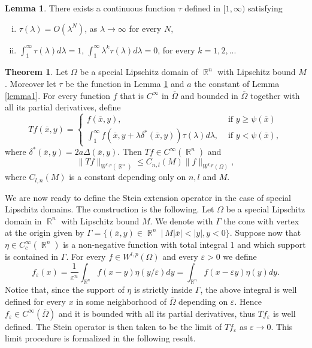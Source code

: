 \documentclass[12pt]{article}
\theoremstyle{definition}
\newtheorem{theorem}{Theorem}
\newtheorem{lemma}{Lemma}
\DeclareMathOperator\rr{\mathbb{R}}
\begin{document}
\begin{lemma}\label{lemma2}
There exists a continuous function $\tau$ defined in $[1,\infty)$ satisfying
\begin{enumerate}[i)]
	\item $\tau(\lambda)=O(\lambda^N)$, as $\lambda \rightarrow \infty$ for every $N,$
	\item $\int_1^\infty \tau(\lambda)d\lambda=1$, $\int_1^\infty \lambda^k\tau(\lambda)d\lambda=0$, for every $k=1,2,...$
\end{enumerate}
\end{lemma}


\begin{theorem}\label{defT}Let $\Omega$ be a special Lipschitz domain of $\rr^n$ with Lipschitz bound $M$. Moreover let $\tau$ be the function in Lemma \ref{lemma2} and $a$ the constant of Lemma \ref{lemma1}. For every function $f$ that is $C^\infty$ in $\overline \Omega$ and bounded in $\overline \Omega$ together with all its partial derivatives, define
\[ Tf(\overline x, y)= \begin{cases}
						f(\overline x, y), & \text{ if } y\ge\psi(\overline x) \\
						\int_1^\infty f(\overline x, y+ \lambda \delta^*(\overline x,y))\tau(\lambda)d\lambda, & \text{ if } y<\psi(\overline x),		
\end{cases}
\]
where $\delta^*(\overline x,y)=2a\Delta(\overline x, y).$ Then $Tf \in C^\infty(\rr^n)$ and 
\[\| Tf\|_{W^{l,p}(\rr^n)}\le C_{n,l}(M) \| f\|_{W^{l,p}(\Omega)} ,\]
where $C_{l,n}(M)$ is a constant depending only on $n,l$ and $M.$
\end{theorem}

We are now ready to define the Stein extension operator in the case of special Lipschitz domains. The construction is the following. Let $\Omega$ be a special Lipschitz domain in $\rr^n$ with Lipschitz bound $M$. We denote with $\Gamma$ the cone with vertex at the origin given by $\Gamma=\{(\overline x, y) \in \rr^n \ | \ M |\overline x|<|y|, y<0 \}$. Suppose now that $\eta \in C^\infty_c(\rr^n)$ is a non-negative function with total integral 1 and which support is contained in $\Gamma.$ For every $f \in W^{l,p}(\Omega)$ and every $\varepsilon>0$ we define
\[f_\varepsilon(x)=\frac{1}{\varepsilon^n}\int_{\rr^n} f(x-y) \eta(y/\varepsilon)dy =\int_{\rr^n} f(x-\varepsilon y) \eta(y)dy.\]
Notice that, since the support of $\eta$ is strictly inside $\Gamma$, the above integral is well defined for every $x$ in some neighborhood of $\overline \Omega$ depending on $\varepsilon$. Hence $f_\varepsilon \in C^\infty(\overline\Omega)$ and it is bounded with all its partial derivatives, thus $Tf_\varepsilon$ is well defined. The Stein operator is then taken to be the limit of $Tf_\varepsilon$ as $\varepsilon \to 0.$ This limit procedure is formalized in the following result.
\end{document}
